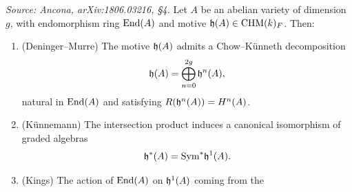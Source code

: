 \begin{theorem}
  \label{thm:classic-motive}
  \textit{Source: Ancona, arXiv:1806.03216, §4.}
  Let \(A\) be an abelian variety of dimension \(g\), with endomorphism ring
  \(\mathrm{End}(A)\) and motive \(\mathfrak{h}(A) \in \mathrm{CHM}(k)_{F}\). Then:
  \begin{enumerate}
    \item (Deninger--Murre) The motive \(\mathfrak{h}(A)\) admits a Chow--K\"unneth
      decomposition
      \[\mathfrak{h}(A) = \bigoplus_{n=0}^{2g} \mathfrak{h}^n(A),\]
      natural in \(\mathrm{End}(A)\) and satisfying \(R(\mathfrak{h}^n(A)) = H^n(A)\).
    \item (K\"unnemann) The intersection product induces a canonical isomorphism
      of graded algebras
      \[\mathfrak{h}^*(A) = \mathrm{Sym}^* \mathfrak{h}^1(A).\]
    \item (Kings) The action of \(\mathrm{End}(A)\) on \(\mathfrak{h}^1(A)\) coming from the

\end{enumerate}
\end{theorem}
